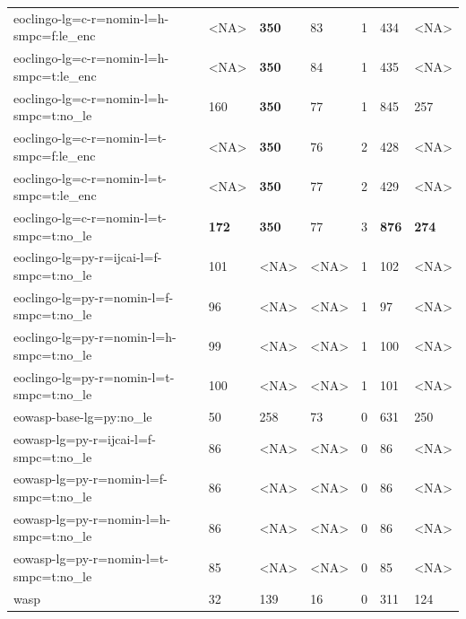 \documentclass{article}
\begin{document}
\begin{table}[t!]
\begin{tabular}{lllllll}
eoclingo-lg=c-r=nomin-l=h-smpc=f:le\_enc & <NA> & \textbf{350} & 83 & 1 & 434 & <NA> \\
eoclingo-lg=c-r=nomin-l=h-smpc=t:le\_enc & <NA> & \textbf{350} & 84 & 1 & 435 & <NA> \\
eoclingo-lg=c-r=nomin-l=h-smpc=t:no\_le & 160 & \textbf{350} & 77 & 1 & 845 & 257 \\
eoclingo-lg=c-r=nomin-l=t-smpc=f:le\_enc & <NA> & \textbf{350} & 76 & 2 & 428 & <NA> \\
eoclingo-lg=c-r=nomin-l=t-smpc=t:le\_enc & <NA> & \textbf{350} & 77 & 2 & 429 & <NA> \\
eoclingo-lg=c-r=nomin-l=t-smpc=t:no\_le & \textbf{172} & \textbf{350} & 77 & 3 & \textbf{876} & \textbf{274} \\
eoclingo-lg=py-r=ijcai-l=f-smpc=t:no\_le & 101 & <NA> & <NA> & 1 & 102 & <NA> \\
eoclingo-lg=py-r=nomin-l=f-smpc=t:no\_le & 96 & <NA> & <NA> & 1 & 97 & <NA> \\
eoclingo-lg=py-r=nomin-l=h-smpc=t:no\_le & 99 & <NA> & <NA> & 1 & 100 & <NA> \\
eoclingo-lg=py-r=nomin-l=t-smpc=t:no\_le & 100 & <NA> & <NA> & 1 & 101 & <NA> \\
eowasp-base-lg=py:no\_le & 50 & 258 & 73 & 0 & 631 & 250 \\
eowasp-lg=py-r=ijcai-l=f-smpc=t:no\_le & 86 & <NA> & <NA> & 0 & 86 & <NA> \\
eowasp-lg=py-r=nomin-l=f-smpc=t:no\_le & 86 & <NA> & <NA> & 0 & 86 & <NA> \\
eowasp-lg=py-r=nomin-l=h-smpc=t:no\_le & 86 & <NA> & <NA> & 0 & 86 & <NA> \\
eowasp-lg=py-r=nomin-l=t-smpc=t:no\_le & 85 & <NA> & <NA> & 0 & 85 & <NA> \\
wasp & 32 & 139 & 16 & 0 & 311 & 124 \\
\bottomrule
\end{tabular}
\end{table}

            
\end{document}
